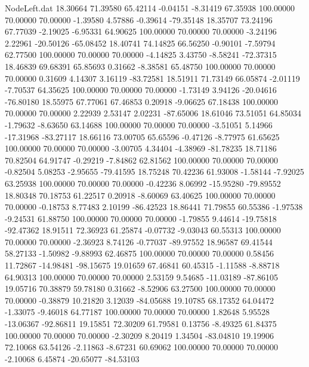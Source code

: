 \begin{filecontents}{NodeLeft.dat}
  18.30664   71.39580   65.42114    -0.04151   -8.31419   67.35938  100.00000   70.00000   70.00000   -1.39580    4.57886   -0.39614  -79.35148
  18.35707   73.24196   67.77039    -2.19025   -6.95331   64.90625  100.00000   70.00000   70.00000   -3.24196    2.22961  -20.50126  -65.08452
  18.40741   74.14825   66.56250    -0.90101   -7.59794   62.77500  100.00000   70.00000   70.00000   -4.14825    3.43750   -8.58241  -72.37315
  18.46839   69.68391   65.85693     0.31662   -8.38581   65.48750  100.00000   70.00000   70.00000    0.31609    4.14307    3.16119  -83.72581
  18.51911   71.73149   66.05874    -2.01119   -7.70537   64.35625  100.00000   70.00000   70.00000   -1.73149    3.94126  -20.04616  -76.80180
  18.55975   67.77061   67.46853     0.20918   -9.06625   67.18438  100.00000   70.00000   70.00000    2.22939    2.53147    2.02231  -87.65006
  18.61046   73.51051   64.85034    -1.79632   -8.63650   63.14688  100.00000   70.00000   70.00000   -3.51051    5.14966  -17.31968  -83.27117
  18.66116   73.00705   65.65596    -0.47126   -8.77975   61.65625  100.00000   70.00000   70.00000   -3.00705    4.34404   -4.38969  -81.78235
  18.71186   70.82504   64.91747    -0.29219   -7.84862   62.81562  100.00000   70.00000   70.00000   -0.82504    5.08253   -2.95655  -79.41595
  18.75248   70.42236   61.93008    -1.58144   -7.92025   63.25938  100.00000   70.00000   70.00000   -0.42236    8.06992  -15.95280  -79.89552
  18.80348   70.18753   61.22517     0.20918   -8.60069   63.40625  100.00000   70.00000   70.00000   -0.18753    8.77483    2.10199  -86.42523
  18.86441   71.79855   60.55386    -1.97538   -9.24531   61.88750  100.00000   70.00000   70.00000   -1.79855    9.44614  -19.75818  -92.47362
  18.91511   72.36923   61.25874    -0.07732   -9.03043   60.55313  100.00000   70.00000   70.00000   -2.36923    8.74126   -0.77037  -89.97552
  18.96587   69.41544   58.27133    -1.50982   -9.88993   62.46875  100.00000   70.00000   70.00000    0.58456   11.72867  -14.98481  -98.15675
  19.01659   67.46841   60.45315    -1.11588   -8.88718   64.90313  100.00000   70.00000   70.00000    2.53159    9.54685  -11.03189  -87.86105
  19.05716   70.38879   59.78180     0.31662   -8.52906   63.27500  100.00000   70.00000   70.00000   -0.38879   10.21820    3.12039  -84.05688
  19.10785   68.17352   64.04472    -1.33075   -9.46018   64.77187  100.00000   70.00000   70.00000    1.82648    5.95528  -13.06367  -92.86811
  19.15851   72.30209   61.79581     0.13756   -8.49325   61.84375  100.00000   70.00000   70.00000   -2.30209    8.20419    1.34504  -83.04810
  19.19906   72.10068   63.54126    -2.11863   -8.67231   60.69062  100.00000   70.00000   70.00000   -2.10068    6.45874  -20.65077  -84.53103

\end{filecontents}
